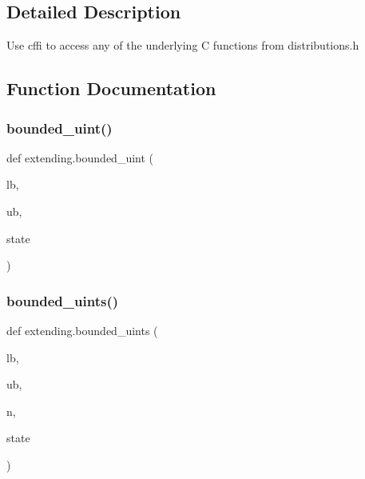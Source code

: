 \subsection{Detailed Description}
\begin{DoxyVerb}Use cffi to access any of the underlying C functions from distributions.h
\end{DoxyVerb}
 

\subsection{Function Documentation}
\mbox{\label{namespaceextending_ad8fa47df7e72bc24c54020bb8f8bafee}} 
\subsubsection{\texorpdfstring{bounded\+\_\+uint()}{bounded\_uint()}}
{\footnotesize\ttfamily def extending.\+bounded\+\_\+uint (\begin{DoxyParamCaption}\item[{}]{lb,  }\item[{}]{ub,  }\item[{}]{state }\end{DoxyParamCaption})}

\mbox{\label{namespaceextending_a94f605864f41957f25eaccc9b95a7fb5}} 
\subsubsection{\texorpdfstring{bounded\+\_\+uints()}{bounded\_uints()}}
{\footnotesize\ttfamily def extending.\+bounded\+\_\+uints (\begin{DoxyParamCaption}\item[{}]{lb,  }\item[{}]{ub,  }\item[{}]{n,  }\item[{}]{state }\end{DoxyParamCaption})}

\mbox{\label{namespaceextending_a9428868b82dc14cfc42f679c7cd44bd5}} 
